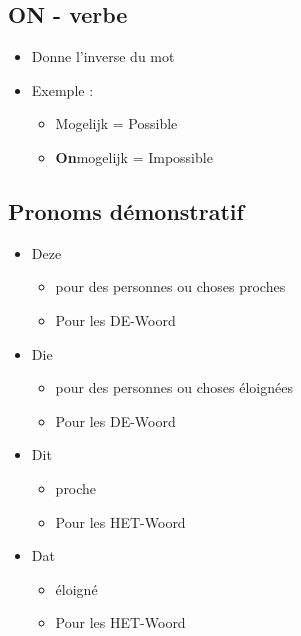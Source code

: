 \documentclass[a4paper]{article}
\begin{document}
\subsection{ON - verbe}
\begin{itemize}[label=\textbullet, font=\Large]
  \item Donne l'inverse du mot
  \item Exemple :
  \begin{itemize}[label=, font=\scriptsize]
    \item Mogelijk = Possible
    \item \textbf{On}mogelijk = Impossible
  \end{itemize}
\end{itemize}

\subsection{Pronoms démonstratif}
\begin{itemize}[label=\textbullet, font=\Large]
  \item Deze
  \begin{itemize}[label=, font=\scriptsize]
    \item pour des personnes ou choses proches
    \item Pour les DE-Woord
  \end{itemize} 
  \item Die
  \begin{itemize}[label=, font=\scriptsize]
    \item pour des personnes ou choses éloignées
    \item Pour les DE-Woord
  \end{itemize} 
  \item Dit
  \begin{itemize}[label=, font=\scriptsize]
    \item proche
    \item Pour les HET-Woord
  \end{itemize} 
  \item Dat
  \begin{itemize}[label=, font=\scriptsize]
    \item éloigné
    \item Pour les HET-Woord
  \end{itemize} 
\end{itemize}
\end{document}
